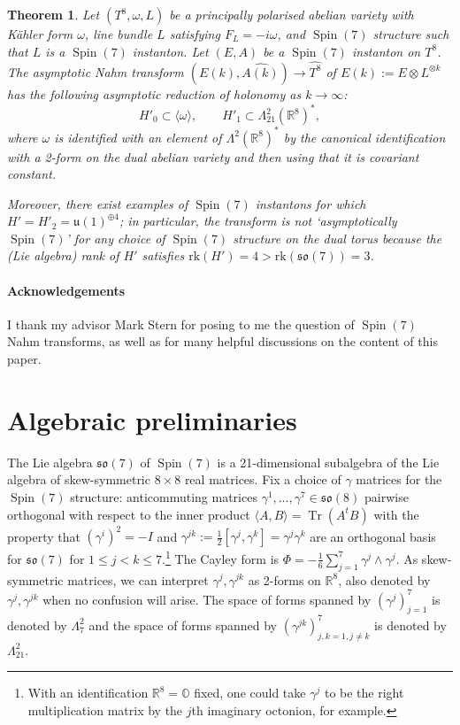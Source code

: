 \documentclass{article}
\newcommand{\wh}{\widehat}
\newcommand{\real}{\mathbb{R}}
\newcommand{\octo}{\mathbb{O}}
\newcommand{\so}{\mathfrak{so}}
\newcommand{\rk}{\mathrm{rk}}
\DeclareMathOperator\Spin{Spin}
\DeclareMathOperator{\Tr}{Tr}
\newtheorem{theorem}{Theorem}
\theoremstyle{definition}
\theoremstyle{remark}
\begin{document}
\begin{theorem}
    Let $(T^8, \omega, L)$ be a principally polarised abelian variety with K\"ahler form $\omega$, line bundle $L$ satisfying $F_L = -i\omega$, and $\Spin(7)$ structure such that $L$ is a $\Spin(7)$ instanton.
    Let $(E,A)$ be a $\Spin(7)$ instanton on $T^8$.
    The asymptotic Nahm transform $(\wh{E(k)}, \wh{A(k)}) \to \wh{T^8}$ of $E(k) := E \otimes L^{\otimes k}$ has the following asymptotic reduction of holonomy as $k \to \infty$:
    \[
        H'_0 \subset \langle \omega \rangle, \qquad
        H'_1 \subset \Lambda^2_{21} (\real^8)^*,
   \]
   where $\omega$ is identified with an element of $\Lambda^2 (\real^8)^*$ by the canonical identification with a 2-form on the dual abelian variety and then using that it is covariant constant.

   Moreover, there exist examples of $\Spin(7)$ instantons for which $H' = H'_2 = \mathfrak{u}(1)^{\oplus 4}$; in particular, the transform is not `asymptotically $\Spin(7)$' for any choice of $\Spin(7)$ structure on the dual torus because the (Lie algebra) rank of $H'$ satisfies $\rk(H') = 4 > \rk(\so(7))  = 3$. 
\end{theorem}

\paragraph*{Acknowledgements} I thank my advisor Mark Stern for posing to me the question of $\Spin(7)$ Nahm transforms, as well as for many helpful discussions on the content of this paper.


\section{Algebraic preliminaries}
\label{sec:algebra}

The Lie algebra $\so(7)$ of $\Spin(7)$ is a 21-dimensional subalgebra of the Lie algebra of skew-symmetric $8 \times 8$ real matrices.
Fix a choice of $\gamma$ matrices for the $\Spin(7)$ structure: anticommuting matrices $\gamma^1, \ldots, \gamma^7 \in \so(8)$ pairwise orthogonal with respect to the inner product $\langle A, B \rangle = \Tr(A^t B)$ with the property that $(\gamma^i)^2 = -I$ and $\gamma^{jk} := \frac{1}{2} [\gamma^j, \gamma^k] = \gamma^j \gamma^k$ are an orthogonal basis for $\so(7)$ for $1 \le j < k \le 7$.\footnote{With an identification $\real^8 = \octo$ fixed, one could take $\gamma^j$ to be the right multiplication matrix by the $j$th imaginary octonion, for example.}
The Cayley form is $\Phi = -\frac{1}{6} \sum_{j=1}^7 \gamma^j \wedge \gamma^j$.
As skew-symmetric matrices, we can interpret $\gamma^j, \gamma^{jk}$ as 2-forms on $\real^8$, also denoted by $\gamma^j, \gamma^{jk}$ when no confusion will arise.
The space of forms spanned by $(\gamma^j)_{j=1}^7$ is denoted by $\Lambda^2_7$ and the space of forms spanned by $(\gamma^{jk})_{j,k=1, j\neq k}^7$ is denoted by $\Lambda^2_{21}$.
\end{document}
